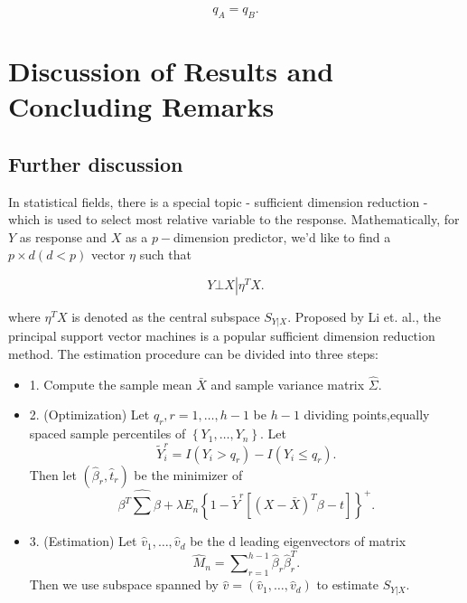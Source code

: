 \documentclass[11pt]{scrartcl} %
\begin{document}
\begin{equation*}
{q_A} = {q_B}.
\end{equation*}


\section{Discussion of Results and Concluding Remarks}


\subsection{Further discussion}

In statistical fields, there is a special topic - sufficient dimension reduction - which is used to select most relative variable to the response. Mathematically, for $Y$ as response and $X$ as a $p-$dimension predictor, we'd like to find a $p \times d\left( {d < p} \right)$ vector $\eta $ such that

\begin{equation*}
Y \bot X\left| {{\eta ^T}X}. \right.
\end{equation*}

where ${\eta ^T}X$ is denoted as the central subspace ${S_{Y\left| X \right.}}$. Proposed by Li et. al.\cite{li2011principal}, the principal support vector machines is a popular sufficient dimension reduction method. The estimation procedure can be divided into three steps:

\begin{itemize}
	\item 1. Compute the sample mean $\bar X$ and sample variance matrix $\hat \Sigma $.
	\item 2. (Optimization) Let ${q_r},r = 1, \ldots ,h - 1$ be $h-1$ dividing points,equally spaced sample percentiles of $\left\{ {{Y_1}, \ldots ,{Y_n}} \right\}$. Let 
	\begin{equation*}
	\tilde Y_i^r = I\left( {{Y_i} > {q_r}} \right) - I\left( {{Y_i} \le {q_r}} \right).
	\end{equation*}
	Then let $\left( {{{\hat \beta }_r},{{\hat t}_r}} \right)$ be the minimizer of 
	\begin{equation*}
	{\beta ^T}\hat \sum \beta  + \lambda {E_n}{\left\{ {1 - {{\tilde Y}^r}\left[ {{{\left( {X - \bar X} \right)}^T}\beta  - t} \right]} \right\}^ + }.
	\end{equation*}
	\item 3. (Estimation)  Let ${\hat v_1}, \ldots ,{\hat v_d}$ be the d leading eigenvectors of matrix
	\begin{equation*}
	{\hat M_n} = \sum\nolimits_{r = 1}^{h - 1} {{{\hat \beta }_r}\hat \beta _r^T}.
	\end{equation*}
	Then we use subspace spanned by $\hat v = \left( {{{\hat v}_1}, \ldots ,{{\hat v}_d}} \right)$ to estimate ${S_{Y\left| X \right.}}$.
\end{itemize}
\end{document}
